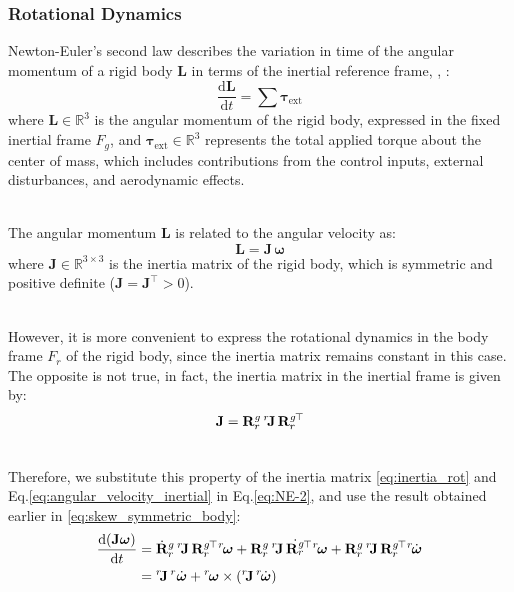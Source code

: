 \documentclass[main]{subfiles}
\begin{document}
\subsubsection{Rotational Dynamics} 
Newton-Euler's second law describes the variation in time of the angular momentum of a rigid body $\mathbf{L}$ 
in terms of the inertial reference frame, \cite{quadrotor_modeling_control_book}, \cite{book-robotics}:
\begin{equation}
 \frac{\mathrm{d} \mathbf{L}}{\mathrm{d}t} = \sum \boldsymbol{\tau}_{\text{ext}}
    \label{eq:NE-2}
\end{equation}
where \( \mathbf{L} \in \mathbb{R}^3 \) is the angular momentum of the rigid body,
expressed in the fixed inertial frame \( F_g \), and \( \boldsymbol{\tau}_{\text{ext}} \in \mathbb{R}^3 \) 
represents the total applied torque about the center of mass, which includes contributions 
from the control inputs, external disturbances, and aerodynamic effects.

\noindent\\
The angular momentum \( \mathbf{L} \) is related to the angular velocity as:
\begin{equation}
 \mathbf{L} = \mathbf{J} \, \boldsymbol{\omega}
    \label{eq:angular_momentum}
\end{equation}
where \( \mathbf{J} \in \mathbb{R}^{3 \times 3} \) is the inertia matrix of the rigid body, 
which is symmetric and positive definite (\( \mathbf{J} = \mathbf{J}^\top > 0 \)).

\noindent\\
However, it is more convenient to express the rotational dynamics 
in the body frame \( F_r \) of the rigid body, since the inertia matrix remains constant in this case. 
The opposite is not true, in fact, the inertia matrix in the inertial frame is given by:
\begin{equation}
 \mathbf{J} =  \mathbf{R}^g_r \, {}^r\mkern-3mu\mathbf{J} \, {\mathbf{R}^g_r}\mkern-2mu^\top 
    \label{eq:inertia_rot}
\end{equation}

\noindent\\
Therefore, we substitute this property of the inertia matrix \eqref{eq:inertia_rot} and 
Eq.\ref{eq:angular_velocity_inertial} in Eq.\ref{eq:NE-2}, 
and use the result obtained earlier in \ref{eq:skew_symmetric_body}:
\begin{align}
 \frac{\mathrm{d} (\mathbf{J} \boldsymbol{\omega})}{\mathrm{d}t} &= 
 \dot{\mathbf{R}}^g_r \, {}^r\mkern-3mu\mathbf{J} \, {\mathbf{R}^g_r}\mkern-2mu^\top {}^r\mkern-2mu\boldsymbol{\omega} +
 \mathbf{R}^g_r \, {}^r\mkern-3mu\mathbf{J} \, \dot{\mathbf{R}^g_r}\mkern-2mu^\top {}^r\mkern-2mu\boldsymbol{\omega} \notag 
 + \mathbf{R}^g_r \, {}^r\mkern-3mu\mathbf{J} \, {\mathbf{R}^g_r}\mkern-2mu^\top {}^r\mkern-2mu\dot{\boldsymbol{\omega}} \notag \\
    &= {}^r\mkern-3mu\mathbf{J} \, {}^r\dot{\boldsymbol{\omega}} + 
 {}^r\mkern-2mu\boldsymbol{\omega} \times ({}^r\mkern-3mu\mathbf{J} \, {}^r\mkern-2mu\dot{\boldsymbol{\omega}})
    \label{eq:derivazione_rotational_law}
\end{align}
\end{document}
